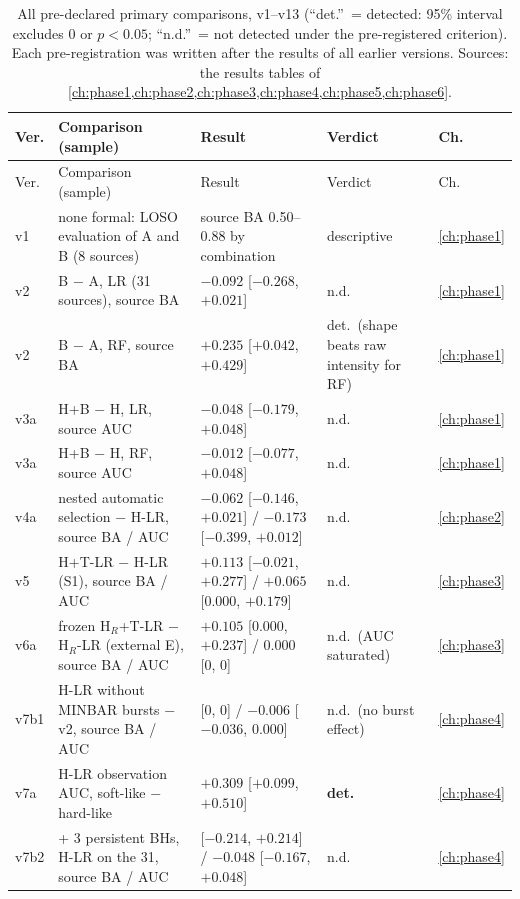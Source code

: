 {\footnotesize\setlength{\tabcolsep}{3pt}
\begin{longtable}{@{}p{1.1cm}>{\raggedright\arraybackslash}p{5.5cm}>{\raggedright\arraybackslash}p{4.6cm}>{\raggedright\arraybackslash}p{2.5cm}l@{}}
\caption[All primary comparisons]{All pre-declared primary comparisons, v1--v13 (``det.''\ = detected: 95\% interval excludes 0 or
$p<0.05$; ``n.d.''\ = not detected under the pre-registered criterion). Each pre-registration was written after the results of all
earlier versions. Sources: the results tables of \cref{ch:phase1,ch:phase2,ch:phase3,ch:phase4,ch:phase5,ch:phase6}.}\label{tab:synthprimaries}\\
\toprule
Ver. & Comparison (sample) & Result & Verdict & Ch. \\
\midrule\endfirsthead
\toprule Ver. & Comparison (sample) & Result & Verdict & Ch. \\ \midrule\endhead
\bottomrule\endfoot
v1 & none formal: LOSO evaluation of A and B (8 sources) & source BA 0.50--0.88 by combination & descriptive & \ref{ch:phase1} \\
v2 & B $-$ A, LR (31 sources), source BA & $-0.092$ [$-0.268$, $+0.021$] & n.d. & \ref{ch:phase1} \\
v2 & B $-$ A, RF, source BA & $+0.235$ [$+0.042$, $+0.429$] & det.\ (shape beats raw intensity for RF) & \ref{ch:phase1} \\
v3a & H+B $-$ H, LR, source AUC & $-0.048$ [$-0.179$, $+0.048$] & n.d. & \ref{ch:phase1} \\
v3a & H+B $-$ H, RF, source AUC & $-0.012$ [$-0.077$, $+0.048$] & n.d. & \ref{ch:phase1} \\
v4a & nested automatic selection $-$ H-LR, source BA / AUC & $-0.062$ [$-0.146$, $+0.021$] / $-0.173$ [$-0.399$, $+0.012$] & n.d. & \ref{ch:phase2} \\
v5 & H+T-LR $-$ H-LR (S1), source BA / AUC & $+0.113$ [$-0.021$, $+0.277$] / $+0.065$ [0.000, $+0.179$] & n.d. & \ref{ch:phase3} \\
v6a & frozen H$_R$+T-LR $-$ H$_R$-LR (external E), source BA / AUC & $+0.105$ [0.000, $+0.237$] / 0.000 [0, 0] & n.d.\ (AUC saturated) & \ref{ch:phase3} \\
v7b1 & H-LR without MINBAR bursts $-$ v2, source BA / AUC & 0.000 [0, 0] / $-0.006$ [$-0.036$, 0.000] & n.d.\ (no burst effect) & \ref{ch:phase4} \\
v7a & H-LR observation AUC, soft-like $-$ hard-like & $+0.309$ [$+0.099$, $+0.510$] & \textbf{det.} & \ref{ch:phase4} \\
v7b2 & + 3 persistent BHs, H-LR on the 31, source BA / AUC & 0.000 [$-0.214$, $+0.214$] / $-0.048$ [$-0.167$, $+0.048$] & n.d. & \ref{ch:phase4} \\

\end{longtable}}
